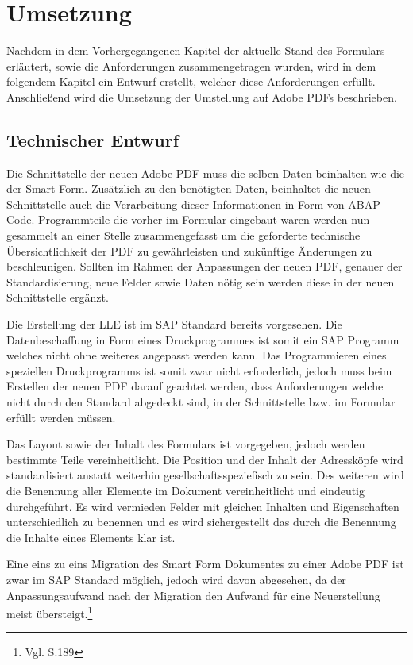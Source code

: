 \chapter{Umsetzung}

 Nachdem in dem Vorhergegangenen Kapitel der aktuelle Stand des Formulars erläutert, sowie die Anforderungen zusammengetragen wurden, wird in dem folgendem Kapitel ein Entwurf erstellt, welcher diese Anforderungen erfüllt. Anschließend wird die Umsetzung der Umstellung auf Adobe PDFs beschrieben.

 \section{Technischer Entwurf}
 
 Die Schnittstelle der neuen Adobe \ac{PDF} muss die selben Daten beinhalten wie die der Smart Form.
 Zusätzlich zu den benötigten Daten, beinhaltet die neuen Schnittstelle auch die Verarbeitung dieser Informationen in Form von \ac{ABAP}-Code. Programmteile die vorher im Formular eingebaut waren werden nun gesammelt an einer Stelle zusammengefasst um die geforderte technische Übersichtlichkeit der PDF zu gewährleisten und zukünftige Änderungen zu beschleunigen. Sollten im Rahmen der Anpassungen der neuen PDF, genauer der Standardisierung, neue Felder sowie Daten nötig sein werden diese in der neuen Schnittstelle ergänzt. 
 
 Die Erstellung der \ac{LLE} ist im SAP Standard bereits vorgesehen. Die Datenbeschaffung in Form eines Druckprogrammes ist somit ein SAP Programm welches nicht ohne weiteres angepasst werden kann. Das Programmieren eines speziellen Druckprogramms ist somit zwar nicht erforderlich, jedoch muss beim Erstellen der neuen PDF darauf geachtet werden, dass Anforderungen welche nicht durch den Standard abgedeckt sind, in der Schnittstelle bzw. im Formular erfüllt werden müssen. 
 
 Das Layout sowie der Inhalt des Formulars ist vorgegeben, jedoch werden bestimmte Teile vereinheitlicht. Die Position und der Inhalt der Adressköpfe wird standardisiert anstatt weiterhin gesellschaftsspeziefisch zu sein. Des weiteren wird die Benennung aller Elemente im Dokument vereinheitlicht und eindeutig durchgeführt. Es wird vermieden Felder mit gleichen Inhalten und Eigenschaften unterschiedlich zu benennen und es wird sichergestellt das durch die Benennung die Inhalte eines Elements klar ist.
 
 Eine eins zu eins Migration des Smart Form Dokumentes zu einer Adobe PDF ist zwar im SAP Standard möglich, jedoch wird davon abgesehen, da der Anpassungsaufwand nach der Migration den Aufwand für eine Neuerstellung meist übersteigt.\footnote{Vgl. \cite{Schmiechen.2016} S.189}
 
